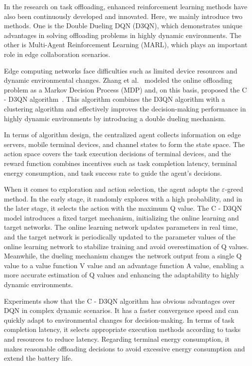 \documentclass[journal]{IEEEtran}
\begin{document}
In the research on task offloading, enhanced reinforcement learning methods have also been continuously developed and innovated. Here, we mainly introduce two methods. One is the Double Dueling DQN (D3QN), which demonstrates unique advantages in solving offloading problems in highly dynamic environments. The other is Multi-Agent Reinforcement Learning (MARL), which plays an important role in edge collaboration scenarios.

Edge computing networks face difficulties such as limited device resources and dynamic environmental changes. 
Zhang et al.~\cite{zhang2023clustering} modeled the online offloading problem as a Markov Decision Process (MDP) and, 
on this basis, proposed the C - D3QN algorithm~\cite{zhang2023clustering}. 
This algorithm combines the D3QN algorithm with a clustering algorithm and effectively improves the 
decision-making performance in highly dynamic environments by introducing a double dueling mechanism.

In terms of algorithm design, the centralized agent collects information on edge servers, mobile terminal devices, and channel states to form the state space. The action space covers the task execution decisions of terminal devices, and the reward function combines incentives such as task completion latency, terminal energy consumption, and task success rate to guide the agent's decisions.

When it comes to exploration and action selection, the agent adopts the $\varepsilon$-greed method. In the early 
stage, it randomly explores with a high probability, and in the later stage, it selects the action 
with the maximum Q value. The C - D3QN model introduces a fixed target mechanism, initializing the 
online learning and target networks. The online learning network updates parameters in real time, and 
the target network is periodically updated to the parameter values of the online learning network to stabilize training and avoid overestimation of Q values. Meanwhile, the dueling mechanism changes the network output from a single Q value to a value function V value and an advantage function A value, enabling a more accurate estimation of Q values and enhancing the adaptability to highly dynamic environments.

Experiments show that the C - D3QN algorithm has obvious advantages over DQN in complex dynamic scenarios. It has a faster convergence speed and can quickly adapt to environmental changes for decision-making. In terms of task completion latency, it selects appropriate execution methods according to tasks and resources to reduce latency. Regarding terminal energy consumption, it makes reasonable offloading decisions to avoid excessive energy consumption and extend the battery life.
\end{document}
